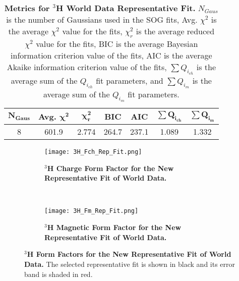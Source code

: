 \begin{table}[!h]
\centering
\begin{tabular}{|c c c c c c c|}
\hline
\textbf{$\boldsymbol{N_{Gaus}}$} & \textbf{Avg. $\boldsymbol{\chi^2}$} & \textbf{$\boldsymbol{\chi^2_r}$} & \textbf{BIC} & \textbf{AIC} & \textbf{$\boldsymbol{\sum Q_{i_{ch}}}$} & \textbf{$\boldsymbol{\sum Q_{i_{m}}}$}\\
\hline
8 & 601.9 & 2.774 & 264.7 & 237.1 & 1.089 & 1.332\\
\hline
\end{tabular}
\caption[Metrics for $^3$H World Data Representative Fit]{{\bf{Metrics for $^3$H World Data Representative Fit.}} $N_{Gaus}$ is the number of Gaussians used in the SOG fits, Avg. $\chi^2$ is the average $\chi^2$ value for the fits, $\chi^2_r$ is the average reduced $\chi^2$ value for the fits, BIC is the average Bayesian information criterion value of the fits, AIC is the average Akaike information criterion value of the fits, $\sum Q_{i_{ch}}$ is the average sum of the $Q_{i_{ch}}$ fit parameters, and $\sum Q_{i_{m}}$ is the average sum of the $Q_{i_{m}}$ fit parameters.}
\label{tab:3h_rep_fit_stats}
\end{table}

\begin{figure}[!ht]
\begin{subfigure}{1.\textwidth}
  \centering
  \texttt{[image: 3H\_Fch\_Rep\_Fit.png]}
  \caption{\bf{$^3$H Charge Form Factor for the New Representative Fit of World Data.}}
  \label{fig:3h_fch_rep_fit}
\end{subfigure}\\
\begin{subfigure}{1.\textwidth}
  \centering
  \texttt{[image: 3H\_Fm\_Rep\_Fit.png]}
  \caption{\bf{$^3$H Magnetic Form Factor for the New Representative Fit of World Data.}}
  \label{fig:3h_fm_rep_fit}
\end{subfigure}
\caption[$^3$H Form Factors for the New Representative Fit of World Data] {
{\bf{$^3$H Form Factors for the New Representative Fit of World Data.}} The selected representative fit is shown in black and its error band is shaded in red.}
\label{fig:3h_rep_fit}
\end{figure}

